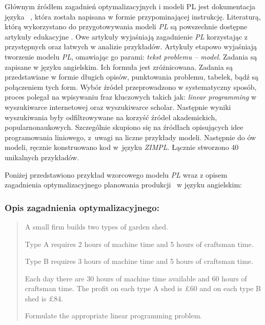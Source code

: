 Głównym źródłem zagadnień optymalizacyjnych i modeli PL jest dokumentacja języka  ~\cite{zimpl_manual}, która została napisana w formie przypominającej instrukcję. Literaturą, którą wykorzystano do przygotowywania modeli \textit{PL} są powszechnie dostępne artykuły edukacyjne \cite{brilliant_linear,byjus_linear,cimt,arsdcollege2020,libretexts_linear,superprof_linear,toppr_graphical}. Owe artykuły wyjaśniają zagadnienie \textit{PL} korzystając z przystępnych oraz łatwych w analizie przykładów. Artykuły etapowo wyjaśniają tworzenie modelu \textit{PL}, omawiając go parami: \textit{tekst problemu -- model}. Zadania są zapisane w języku angielskim. Ich formuła jest zróżnicowana. Zadania są przedstawiane w formie długich opisów, punktowania problemu, tabelek, bądź są połączeniem tych form.
Wybór źródeł przeprowadzono w systematyczny sposób, proces polegał na wpisywaniu fraz kluczowych takich jak: \textit{linear programming} w wyszukiwarce internetowej oraz wyszukiwarce scholar. Następnie wyniki wyszukiwania były odfiltrowywane na korzyść źródeł akademickich, popularnonaukowych. Szczególnie skupiono się na źródłach opisujących idee programowania liniowego, z~uwagi na liczne przykłady modeli. Następnie do ów modeli, ręcznie konstruowano kod w~języku \textit{ZIMPL}. 
Łącznie stworzono 40 unikalnych przykładów. 

Poniżej przedstawiono przykład wzorcowego modelu \textit{PL} wraz z opisem zagadnienia optymalizacyjnego planowania produkcji~\cite{cimt} w języku angielskim:

\subsubsection*{Opis zagadnienia optymalizacyjnego:} \label{sec:model_example}
\begin{quote}

A small firm builds two types of garden shed.

Type A requires 2 hours of machine time and 5 hours of craftsman time.

Type B requires 3 hours of machine time and 5 hours of craftsman time.

Each day there are 30 hours of machine time available and 60 hours of craftsman time. The profit on each type A shed is £60 and on each type B shed is £84. 

Formulate the appropriate linear programming problem.
\end{quote}

